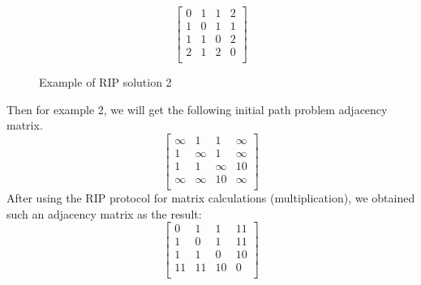 \documentclass[a4paper,12pt,twoside,openright]{report}
\begin{document}
\[
\begin{bmatrix}
    0 & 1 & 1 & 2 \\
    1 & 0 & 1 & 1 \\
    1 & 1 & 0 & 2 \\
    2 & 1 & 2 & 0 \\
\end{bmatrix}
\]
\begin{figure}[H]
\centering
{}
\label{example:rip:2}
\caption{Example of RIP solution 2}
\end{figure}
Then for example 2, we will get the following initial path problem adjacency matrix.
\[
\begin{bmatrix}
    \infty & 1 & 1 & \infty \\
    1 & \infty & 1 & \infty \\
    1 & 1 & \infty & 10 \\
    \infty & \infty & 10 & \infty \\
\end{bmatrix}
\]
After using the RIP protocol for matrix calculations (multiplication), we obtained such an adjacency matrix as the result:
\[
\begin{bmatrix}
    0 & 1 & 1 & 11 \\
    1 & 0 & 1 & 11 \\
    1 & 1 & 0 & 10 \\
    11 & 11 & 10 & 0 \\
\end{bmatrix}
\]
\end{document}
